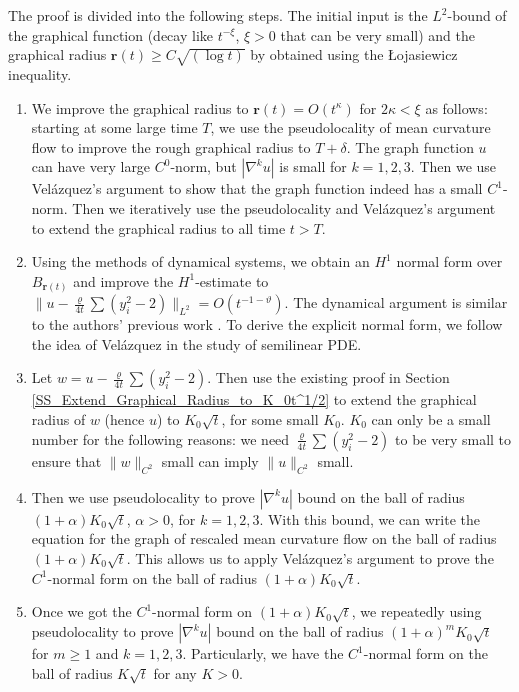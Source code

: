 \documentclass[11pt]{amsart}
\numberwithin{equation}{section}
\numberwithin{equation}{section}
\newcommand{\br}{\mathbf{r}}
\begin{document}
	
	The proof is divided into the following steps. The initial input is the $L^2$-bound of the graphical function (decay like $t^{-\xi}$, $\xi>0$ that can be very small) and the graphical radius $\br(t)\geq C\sqrt{(\log t)}$ by \cite{CM2} obtained using the {\L}ojasiewicz inequality. 
	\begin{enumerate}
		\item We improve the graphical radius to $\br(t)=O(t^{\kappa})$ for $2\kappa<\xi$ as follows: starting at some large time $T$, we use the pseudolocality of mean curvature flow to improve the rough graphical radius to $T+\delta$. The graph function $u$ can have very large $C^0$-norm, but $|\nabla^k u|$ is small for $k=1,2,3$. Then we use Vel\'azquez's argument to show that the graph function indeed has a small $C^1$-norm. Then we iteratively use the pseudolocality and Vel\'azquez's argument to extend the graphical radius to all time $t>T$.
		\item Using the methods of dynamical systems, we obtain an $H^1$ normal form over $B_{\br(t)}$ and improve the $H^1$-estimate to $\|u-\frac{\varrho}{4t}\sum (y_i^2-2)\|_{L^2}=O(t^{-1-\vartheta})$. The dynamical argument is similar to the authors' previous work \cite{SX1, SX2, SX3}. To derive the explicit normal form, we follow the idea of Vel\'azquez \cite{V1} in the study of semilinear PDE.
		\item Let $w=u-\frac{\varrho}{4t}\sum (y_i^2-2)$. Then use the existing proof in Section \ref{SS_Extend_Graphical_Radius_to_K_0t^1/2} to extend the graphical radius of $w$ (hence $u$) to $K_0\sqrt{t}$, for some small $K_0$. $K_0$ can only be a small number for the following reasons: we need $\frac{\varrho}{4t}\sum (y_i^2-2)$ to be very small to ensure that $\|w\|_{C^2}$ small can imply $\|u\|_{C^2}$ small. 
		\item Then we use pseudolocality to prove $|\nabla^k u|$ bound on the ball of radius $(1+\alpha) K_0\sqrt{t}$, $\alpha>0$, for $k=1,2,3$. With this bound, we can write the equation for the graph of rescaled mean curvature flow on the ball of radius $(1+\alpha) K_0\sqrt{t}$. This allows us to apply Vel\'azquez's argument to prove the $C^1$-normal form on the ball of radius $(1+\alpha) K_0\sqrt{t}$.
		\item Once we got the $C^1$-normal form on $(1+\alpha) K_0\sqrt{t}$, we repeatedly using pseudolocality to prove $|\nabla^k u|$ bound on the ball of radius $(1+\alpha)^m K_0\sqrt{t}$ for $m\geq 1$ and $k=1,2,3$. Particularly, we have the $C^1$-normal form on the ball of radius $K\sqrt{t}$ for any $K>0$.
	\end{enumerate}
	
\end{document}
